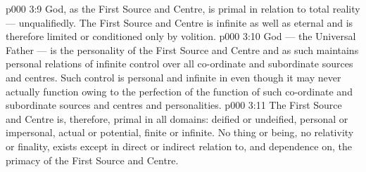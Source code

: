 \vs p000 3:9 \pc God, as the First Source and Centre, is primal in relation to total reality --- unqualifiedly. The First Source and Centre is infinite as well as eternal and is therefore limited or conditioned only by volition.
\vs p000 3:10 God --- the Universal Father --- is the personality of the First Source and Centre and as such maintains personal relations of infinite control over all co\hyp{}ordinate and subordinate sources and centres. Such control is personal and infinite in  even though it may never actually function owing to the perfection of the function of such co\hyp{}ordinate and subordinate sources and centres and personalities.
\vs p000 3:11 The First Source and Centre is, therefore, primal in all domains: deified or undeified, personal or impersonal, actual or potential, finite or infinite. No thing or being, no relativity or finality, exists except in direct or indirect relation to, and dependence on, the primacy of the First Source and Centre.
